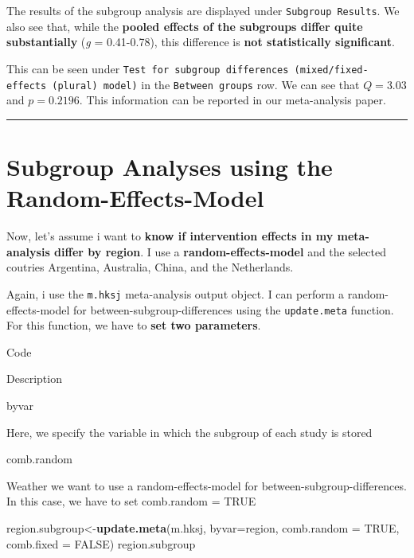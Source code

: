 \documentclass[]{book}
\newenvironment{Shaded}{\begin{snugshade}}{\end{snugshade}}
\newcommand{\DataTypeTok}[1]{\textcolor[rgb]{0.13,0.29,0.53}{#1}}
\newcommand{\KeywordTok}[1]{\textcolor[rgb]{0.13,0.29,0.53}{\textbf{#1}}}
\newcommand{\NormalTok}[1]{#1}
\newcommand{\OtherTok}[1]{\textcolor[rgb]{0.56,0.35,0.01}{#1}}
\begin{document}
The results of the subgroup analysis are displayed under \texttt{Subgroup\ Results}. We also see that, while the \textbf{pooled effects of the subgroups differ quite substantially} (\emph{g} = 0.41-0.78), this difference is \textbf{not statistically significant}.

This can be seen under \texttt{Test\ for\ subgroup\ differences\ (mixed/fixed-effects\ (plural)\ model)} in the \texttt{Between\ groups} row. We can see that \(Q=3.03\) and \(p=0.2196\). This information can be reported in our meta-analysis paper.

\begin{center}\rule{0.5\linewidth}{\linethickness}\end{center}

\hypertarget{subgroup-analyses-using-the-random-effects-model}{%
\section{Subgroup Analyses using the Random-Effects-Model}\label{subgroup-analyses-using-the-random-effects-model}}

Now, let's assume i want to \textbf{know if intervention effects in my meta-analysis differ by region}. I use a \textbf{random-effects-model} and the selected coutries Argentina, Australia, China, and the Netherlands.

Again, i use the \texttt{m.hksj} meta-analysis output object. I can perform a random-effects-model for between-subgroup-differences using the \texttt{update.meta} function. For this function, we have to \textbf{set two parameters}.

Code

Description

byvar

Here, we specify the variable in which the subgroup of each study is stored

comb.random

Weather we want to use a random-effects-model for between-subgroup-differences. In this case, we have to set comb.random = TRUE

\begin{Shaded}
\begin{Highlighting}[]
\NormalTok{region.subgroup<-}\KeywordTok{update.meta}\NormalTok{(m.hksj, }
                             \DataTypeTok{byvar=}\NormalTok{region, }
                             \DataTypeTok{comb.random =} \OtherTok{TRUE}\NormalTok{, }
                             \DataTypeTok{comb.fixed =} \OtherTok{FALSE}\NormalTok{)}
\NormalTok{region.subgroup}
\end{Highlighting}
\end{Shaded}
\end{document}
